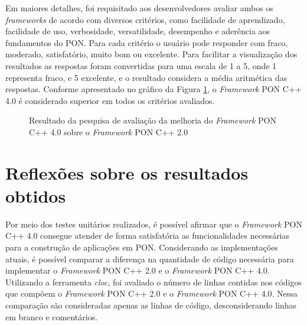Em maiores detalhes, foi requisitado aos desenvolvedores avaliar ambos os
\textit{frameworks} de acordo com diversos critérios, como facilidade de
aprendizado, facilidade de uso, verbosidade, versatilidade, desempenho e
aderência aos fundamentos do PON. Para cada critério o usuário pode responder
com fraco, moderado, satisfatório, muito bom ou excelente. Para facilitar a
visualização dos resultados as respostas foram convertidas para uma escala de 1
a 5, onde 1 representa fraco, e 5 excelente, e o resultado considera a média
aritmética das respostas. Conforme apresentado no gráfico da Figura
\ref{fig:fw_compare2}, o \textit{Framework} PON C++ 4.0 é considerado  superior
em todos os critérios avaliados.

\begin{figure}[!htb]
\centering
{}
\caption{Resultado da pesquisa de avaliação da melhoria do \textit{Framework}
PON C++ 4.0 sobre o \textit{Framework} PON C++ 2.0}
\label{fig:fw_compare2}
\end{figure}

\section{Reflexões sobre os resultados obtidos}\label{sec:fw4_reflex}

Por meio dos testes unitários realizados, é possível afirmar que o
\textit{Framework} PON C++ 4.0 consegue atender de forma satisfatória as
funcionalidades necessárias para a construção de aplicações em PON. Considerando
as implementações atuais, é possível comparar a diferença na quantidade de
código necessária para implementar o \textit{Framework} PON C++ 2.0 e o
\textit{Framework} PON C++ 4.0. Utilizando a ferramenta \textit{cloc}, foi
avaliado o número de linhas contidas nos códigos que compõem o
\textit{Framework} PON C++ 2.0 e o \textit{Framework} PON C++ 4.0. Nessa
comparação são consideradas apenas as linhas de código, desconsiderando linhas
em branco e comentários.


